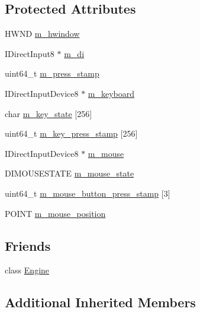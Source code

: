 \subsection*{Protected Attributes}
\begin{DoxyCompactItemize}
\item 
H\+W\+ND \hyperlink{classmage_1_1_input_a1b33f0e27c18870391633b1883c3f615}{m\+\_\+hwindow}
\item 
I\+Direct\+Input8 $\ast$ \hyperlink{classmage_1_1_input_a6169d17f5a782039c7aefd0ffc5ba1bf}{m\+\_\+di}
\item 
uint64\+\_\+t \hyperlink{classmage_1_1_input_a30ac0d05616daa4211b59d680fae6d76}{m\+\_\+press\+\_\+stamp}
\item 
I\+Direct\+Input\+Device8 $\ast$ \hyperlink{classmage_1_1_input_a18ffc2becd62b77e9c4830e92cdf9999}{m\+\_\+keyboard}
\item 
char \hyperlink{classmage_1_1_input_aa0f92d1f06d3f952611ccdb69c9da1d4}{m\+\_\+key\+\_\+state} \mbox{[}256\mbox{]}
\item 
uint64\+\_\+t \hyperlink{classmage_1_1_input_a383109c45d2a0b0edeb482de8b53d53b}{m\+\_\+key\+\_\+press\+\_\+stamp} \mbox{[}256\mbox{]}
\item 
I\+Direct\+Input\+Device8 $\ast$ \hyperlink{classmage_1_1_input_ab62252cea073f7f0fae71ad4cb76a288}{m\+\_\+mouse}
\item 
D\+I\+M\+O\+U\+S\+E\+S\+T\+A\+TE \hyperlink{classmage_1_1_input_a14b8cf407e86724f900d2c4385461cfc}{m\+\_\+mouse\+\_\+state}
\item 
uint64\+\_\+t \hyperlink{classmage_1_1_input_accf558cd7da26ec27b24fde21627a07e}{m\+\_\+mouse\+\_\+button\+\_\+press\+\_\+stamp} \mbox{[}3\mbox{]}
\item 
P\+O\+I\+NT \hyperlink{classmage_1_1_input_a28b8ec250a8d0d0efe0da713060b8599}{m\+\_\+mouse\+\_\+position}
\end{DoxyCompactItemize}
\subsection*{Friends}
\begin{DoxyCompactItemize}
\item 
class \hyperlink{classmage_1_1_input_a3e1914489e4bed4f9f23cdeab34a43dc}{Engine}
\end{DoxyCompactItemize}
\subsection*{Additional Inherited Members}


